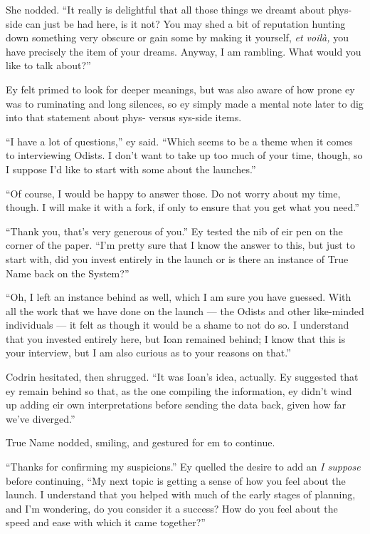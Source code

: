 She nodded. ``It really is delightful that all those things we dreamt about phys-side can just be had here, is it not? You may shed a bit of reputation hunting down something very obscure or gain some by making it yourself, \emph{et voilà,} you have precisely the item of your dreams. Anyway, I am rambling. What would you like to talk about?''

Ey felt primed to look for deeper meanings, but was also aware of how prone ey was to ruminating and long silences, so ey simply made a mental note later to dig into that statement about phys- versus sys-side items.

``I have a lot of questions,'' ey said. ``Which seems to be a theme when it comes to interviewing Odists. I don't want to take up too much of your time, though, so I suppose I'd like to start with some about the launches.''

``Of course, I would be happy to answer those. Do not worry about my time, though. I will make it with a fork, if only to ensure that you get what you need.''

``Thank you, that's very generous of you.'' Ey tested the nib of eir pen on the corner of the paper. ``I'm pretty sure that I know the answer to this, but just to start with, did you invest entirely in the launch or is there an instance of True Name back on the System?''

``Oh, I left an instance behind as well, which I am sure you have guessed. With all the work that we have done on the launch — the Odists and other like-minded individuals — it felt as though it would be a shame to not do so. I understand that you invested entirely here, but Ioan remained behind; I know that this is your interview, but I am also curious as to your reasons on that.''

Codrin hesitated, then shrugged. ``It was Ioan's idea, actually. Ey suggested that ey remain behind so that, as the one compiling the information, ey didn't wind up adding eir own interpretations before sending the data back, given how far we've diverged.''

True Name nodded, smiling, and gestured for em to continue.

``Thanks for confirming my suspicions.'' Ey quelled the desire to add an \emph{I suppose} before continuing, ``My next topic is getting a sense of how you feel about the launch. I understand that you helped with much of the early stages of planning, and I'm wondering, do you consider it a success? How do you feel about the speed and ease with which it came together?''

